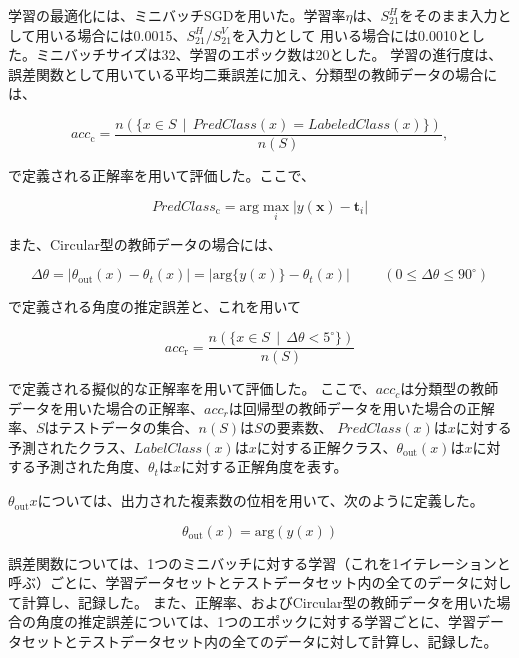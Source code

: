 \documentclass[11pt,a4paper,uplatex]{ujarticle}
\begin{document}
  学習の最適化には、ミニバッチSGDを用いた。学習率$\eta$は、$S_{21}^H$をそのまま入力として用いる場合には0.0015、$S_{21}^{H}/S_{21}^{V}$を入力として
  用いる場合には0.0010とした。ミニバッチサイズは32、学習のエポック数は20とした。
  学習の進行度は、誤差関数として用いている平均二乗誤差に加え、分類型の教師データの場合には、

  \begin{equation}
    acc_{\mathrm{c}} = \frac{n(\{x \in S \, \mid\, PredClass(x) = LabeledClass(x)\})}{n(S)},
  \end{equation} %

  で定義される正解率を用いて評価した。ここで、

  \begin{equation}
    PredClass_{\mathrm{c}} = \mathrm{arg}\max_{i} |y(\mathbf{x}) - \mathbf{t}_i|
  \end{equation} %
  
  また、Circular型の教師データの場合には、

  \begin{equation}
    \Delta\theta = |\theta_{\mathrm{out}}(x) - \theta_{t}(x)| =  |\mathrm{arg}\{y(x)\}- \theta_{t}(x)| \hspace{1cm}( 0 \le \Delta\theta \le 90^{\circ})
  \end{equation} %

  で定義される角度の推定誤差と、これを用いて

  \begin{equation}
    acc_{\mathrm{r}} = \frac{n(\{x \in S \, \mid\, \Delta\theta < 5^{\circ}\})}{n(S)}
  \end{equation} %

  で定義される擬似的な正解率を用いて評価した。
  ここで、$acc_c$は分類型の教師データを用いた場合の正解率、$acc_r$は回帰型の教師データを用いた場合の正解率、$S$はテストデータの集合、$n(S)$は$S$の要素数、
  $PredClass(x)$は$x$に対する予測されたクラス、$LabelClass(x)$は$x$に対する正解クラス、$\theta_{\mathrm{out}}(x)$は$x$に対する予測された角度、$\theta_{t}$は$x$に対する正解角度を表す。

  $\theta_{\mathrm{out}}{x}$については、出力された複素数の位相を用いて、次のように定義した。

  \begin{equation}
    \theta_{\mathrm{out}}(x) = \mathrm{arg}(y(x))
  \end{equation} %

  誤差関数については、1つのミニバッチに対する学習（これを1イテレーションと呼ぶ）ごとに、学習データセットとテストデータセット内の全てのデータに対して計算し、記録した。
  また、正解率、およびCircular型の教師データを用いた場合の角度の推定誤差については、1つのエポックに対する学習ごとに、学習データセットとテストデータセット内の全てのデータに対して計算し、記録した。
\end{document}
